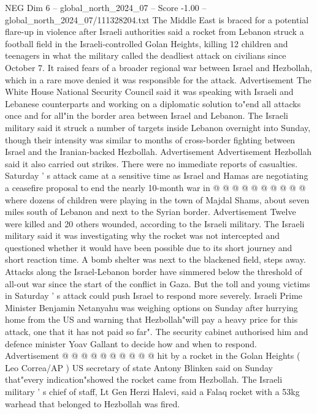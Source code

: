 \begin{textsample}{NEG Dim 6 – global\_north\_2024\_07 – Score -1.00 – global\_north\_2024\_07/111328204.txt}  \label{ex:f6_neg_220}
The Middle East is braced for a potential flare-up in violence after Israeli authorities said a rocket from Lebanon struck a football field in the Israeli-controlled Golan Heights, killing 12 children and teenagers in what the military called the deadliest attack on civilians since October 7.
It raised fears of a broader regional war between Israel and Hezbollah, which in a rare move denied it was responsible for the attack.
Advertisement The White House National Security Council said it was speaking with Israeli and Lebanese counterparts and working on a diplomatic solution to"end all attacks once and for all"in the border area between Israel and Lebanon.
The Israeli military said it struck a number of targets inside Lebanon overnight into Sunday, though their intensity was similar to months of cross-border fighting between Israel and the Iranian-backed Hezbollah.
Advertisement Advertisement Hezbollah said it also carried out strikes.
There were no immediate reports of casualties.
Saturday ' s attack came at a sensitive time as Israel and Hamas are negotiating a ceasefire proposal to end the nearly 10-month war in @ @ @ @ @ @ @ @ @ @ where dozens of children were playing in the town of Majdal Shams, about seven miles south of Lebanon and next to the Syrian border.
Advertisement Twelve were killed and 20 others wounded, according to the Israeli military.
The Israeli military said it was investigating why the rocket was not intercepted and questioned whether it would have been possible due to its short journey and short reaction time.
A bomb shelter was next to the blackened field, steps away.
Attacks along the Israel-Lebanon border have simmered below the threshold of all-out war since the start of the conflict in Gaza.
But the toll and young victims in Saturday ' s attack could push Israel to respond more severely.
Israeli Prime Minister Benjamin Netanyahu was weighing options on Sunday after hurrying home from the US and warning that Hezbollah"will pay a heavy price for this attack, one that it has not paid so far".
The security cabinet authorised him and defence minister Yoav Gallant to decide how and when to respond.
Advertisement @ @ @ @ @ @ @ @ @ @ hit by a rocket in the Golan Heights ( Leo Correa/AP ) US secretary of state Antony Blinken said on Sunday that"every indication"showed the rocket came from Hezbollah.
The Israeli military ' s chief of staff, Lt Gen Herzi Halevi, said a Falaq rocket with a 53kg warhead that belonged to Hezbollah was fired.

\end{textsample}
